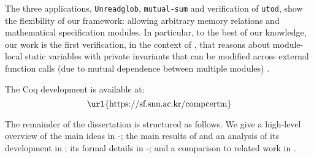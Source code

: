 The three applications, \texttt{Unreadglob}, \texttt{mutual-sum} and
verification of \texttt{utod}, show the flexibility of our framework:
allowing arbitrary memory relations and mathematical specification
modules. In particular, to the best of our knowledge, our work is the
first verification, in the context of \cc{}, that reasons about module-local static
variables with private invariants that can be modified across external function calls (due to
mutual dependence between multiple modules) .

The Coq development is available at:
\[ \text{\url{https://sf.snu.ac.kr/compcertm}} \]

The remainder of the dissertation is structured as follows.
We give a high-level overview of the main ideas in
-;
the main results of \ccm{} and an analysis of its development in ;
its formal details in -;
and a comparison to related work in .




